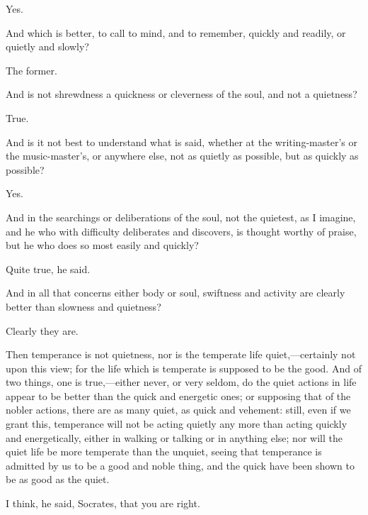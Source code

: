 \documentclass[11pt,letter]{article}
\begin{document}
\par  Yes.

\par  And which is better, to call to mind, and to remember, quickly and readily, or quietly and slowly?

\par  The former.

\par  And is not shrewdness a quickness or cleverness of the soul, and not a quietness?

\par  True.

\par  And is it not best to understand what is said, whether at the writing-master's or the music-master's, or anywhere else, not as quietly as possible, but as quickly as possible?

\par  Yes.

\par  And in the searchings or deliberations of the soul, not the quietest, as I imagine, and he who with difficulty deliberates and discovers, is thought worthy of praise, but he who does so most easily and quickly?

\par  Quite true, he said.

\par  And in all that concerns either body or soul, swiftness and activity are clearly better than slowness and quietness?

\par  Clearly they are.

\par  Then temperance is not quietness, nor is the temperate life quiet,—certainly not upon this view; for the life which is temperate is supposed to be the good. And of two things, one is true,—either never, or very seldom, do the quiet actions in life appear to be better than the quick and energetic ones; or supposing that of the nobler actions, there are as many quiet, as quick and vehement: still, even if we grant this, temperance will not be acting quietly any more than acting quickly and energetically, either in walking or talking or in anything else; nor will the quiet life be more temperate than the unquiet, seeing that temperance is admitted by us to be a good and noble thing, and the quick have been shown to be as good as the quiet.

\par  I think, he said, Socrates, that you are right.
\end{document}
